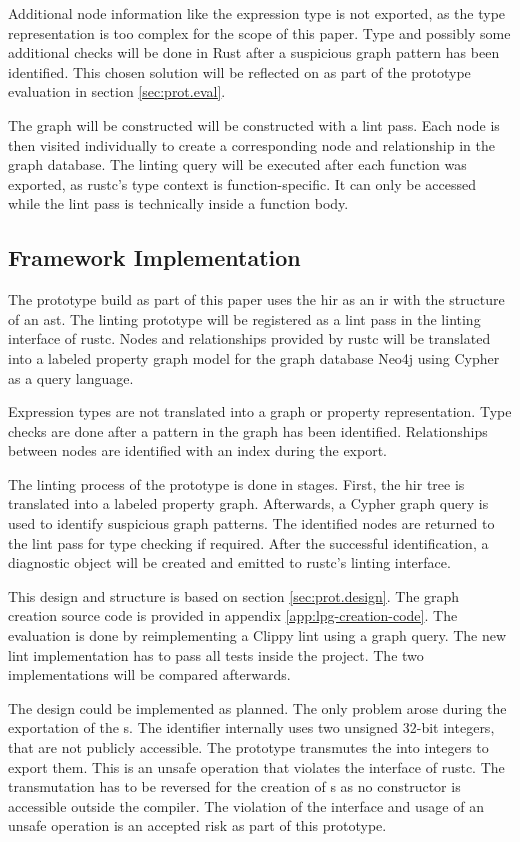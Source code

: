 Additional node information like the expression type is not exported, as the type representation is too complex for the scope of this paper. Type and possibly some additional checks will be done in Rust after a suspicious graph pattern has been identified. This chosen solution will be reflected on as part of the prototype evaluation in section \ref{sec:prot.eval}.

The graph will be constructed will be constructed with a lint pass. Each node is then visited individually to create a corresponding node and relationship in the graph database. The linting query will be executed after each function was exported, as rustc's type context is function-specific. It can only be accessed while the lint pass is technically inside a function body.

\subsection{Framework Implementation}

The prototype build as part of this paper uses the \acrshort{hir} as an \acrlong{ir} with the structure of an \acrshort{ast}. The linting prototype will be registered as a lint pass in the linting interface of rustc. Nodes and relationships provided by rustc will be translated into a labeled property graph model for the graph database Neo4j using Cypher as a query language.

Expression types are not translated into a graph or property representation. Type checks are done after a pattern in the graph has been identified. Relationships between nodes are identified with an index during the export.

The linting process of the prototype is done in stages. First, the \acrshort{hir} tree is translated into a labeled property graph. Afterwards, a Cypher graph query is used to identify suspicious graph patterns. The identified nodes are returned to the lint pass for type checking if required. After the successful identification, a diagnostic object will be created and emitted to rustc's linting interface.

This design and structure is based on section \ref{sec:prot.design}. The graph creation source code is provided in appendix \ref{app:lpg-creation-code}. The evaluation is done by reimplementing a Clippy lint using a graph query. The new lint implementation has to pass all tests inside the project. The two implementations will be compared afterwards.

The design could be implemented as planned. The only problem arose during the exportation of the s. The identifier internally uses two unsigned 32-bit integers, that are not publicly accessible. The prototype transmutes the  into integers to export them. This is an unsafe operation that violates the interface of rustc. The transmutation has to be reversed for the creation of s as no constructor is accessible outside the compiler. The violation of the interface and usage of an unsafe operation is an accepted risk as part of this prototype.

